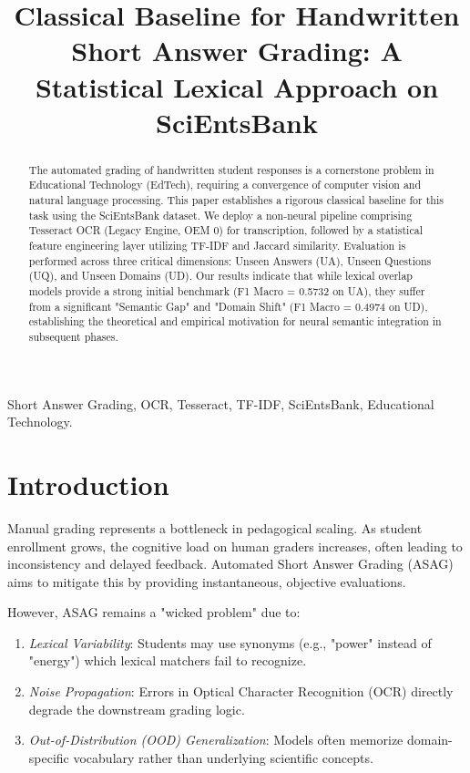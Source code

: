 \documentclass[conference]{IEEEtran}
\begin{document}
\title{Classical Baseline for Handwritten Short Answer Grading: A Statistical Lexical Approach on SciEntsBank}

\author{
}

\maketitle

\begin{abstract}
The automated grading of handwritten student responses is a cornerstone problem in Educational Technology (EdTech), requiring a convergence of computer vision and natural language processing. This paper establishes a rigorous classical baseline for this task using the SciEntsBank dataset. We deploy a non-neural pipeline comprising Tesseract OCR (Legacy Engine, OEM 0) for transcription, followed by a statistical feature engineering layer utilizing TF-IDF and Jaccard similarity. Evaluation is performed across three critical dimensions: Unseen Answers (UA), Unseen Questions (UQ), and Unseen Domains (UD). Our results indicate that while lexical overlap models provide a strong initial benchmark (F1 Macro = 0.5732 on UA), they suffer from a significant "Semantic Gap" and "Domain Shift" (F1 Macro = 0.4974 on UD), establishing the theoretical and empirical motivation for neural semantic integration in subsequent phases.
\end{abstract}

\begin{IEEEkeywords}
Short Answer Grading, OCR, Tesseract, TF-IDF, SciEntsBank, Educational Technology.
\end{IEEEkeywords}

\section{Introduction}
Manual grading represents a bottleneck in pedagogical scaling. As student enrollment grows, the cognitive load on human graders increases, often leading to inconsistency and delayed feedback. Automated Short Answer Grading (ASAG) aims to mitigate this by providing instantaneous, objective evaluations.

However, ASAG remains a "wicked problem" due to:
\begin{enumerate}
    \item \textit{Lexical Variability}: Students may use synonyms (e.g., "power" instead of "energy") which lexical matchers fail to recognize.
    \item \textit{Noise Propagation}: Errors in Optical Character Recognition (OCR) directly degrade the downstream grading logic.
    \item \textit{Out-of-Distribution (OOD) Generalization}: Models often memorize domain-specific vocabulary rather than underlying scientific concepts.
\end{enumerate}
\end{document}
